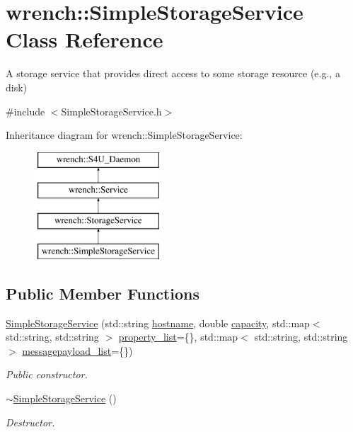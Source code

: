 \hypertarget{classwrench_1_1_simple_storage_service}{}\section{wrench\+:\+:Simple\+Storage\+Service Class Reference}
\label{classwrench_1_1_simple_storage_service}


A storage service that provides direct access to some storage resource (e.\+g., a disk)  




{\ttfamily \#include $<$Simple\+Storage\+Service.\+h$>$}

Inheritance diagram for wrench\+:\+:Simple\+Storage\+Service\+:\begin{figure}[H]
\begin{center}
\leavevmode
\includegraphics[height=4.000000cm]{classwrench_1_1_simple_storage_service}
\end{center}
\end{figure}
\subsection*{Public Member Functions}
\begin{DoxyCompactItemize}
\item 
\hyperlink{classwrench_1_1_simple_storage_service_a736cb5fb3b3d3a61c344cae0770616c4}{Simple\+Storage\+Service} (std\+::string \hyperlink{classwrench_1_1_s4_u___daemon_a52bc0b9a6cd248310749dac086819f00}{hostname}, double \hyperlink{classwrench_1_1_storage_service_aa6697c2288acc1e053268de586ee1861}{capacity}, std\+::map$<$ std\+::string, std\+::string $>$ \hyperlink{classwrench_1_1_service_a032143b1e2d7296dde9b4ca1e34845ce}{property\+\_\+list}=\{\}, std\+::map$<$ std\+::string, std\+::string $>$ \hyperlink{classwrench_1_1_service_a63865f20c92027ab626ab1347b0099d2}{messagepayload\+\_\+list}=\{\})
\begin{DoxyCompactList}\small\item\em Public constructor. \end{DoxyCompactList}\item 
\mbox{\label{classwrench_1_1_simple_storage_service_a1501358a9022c27a148151e92e2a7cab}} 
\hyperlink{classwrench_1_1_simple_storage_service_a1501358a9022c27a148151e92e2a7cab}{$\sim$\+Simple\+Storage\+Service} ()
\begin{DoxyCompactList}\small\item\em Destructor. \end{DoxyCompactList}\end{DoxyCompactItemize}
